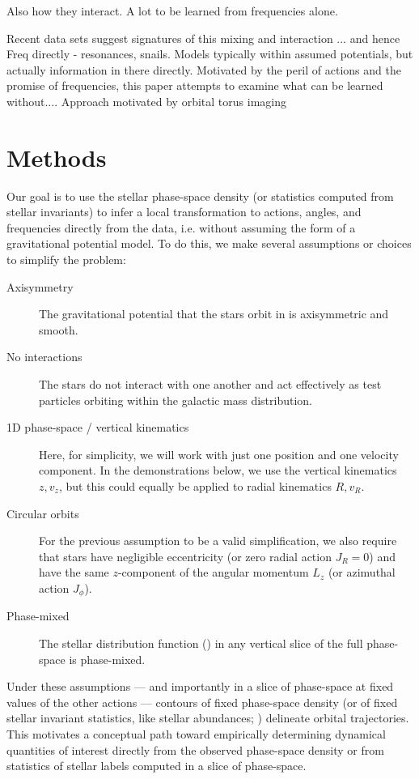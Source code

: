 Also how they interact. A lot to be learned from frequencies alone.

Recent data sets suggest signatures of this mixing and interaction ... and hence Freq
directly - resonances, snails. Models typically within assumed potentials, but actually
information in there directly. Motivated by the peril of actions and the promise of
frequencies, this paper attempts to examine what can be learned without.... Approach
motivated by orbital torus imaging


\section{Methods} \label{sec:methods}

Our goal is to use the stellar phase-space density (or statistics computed from stellar
invariants) to infer a local transformation to actions, angles, and frequencies directly
from the data, i.e. without assuming the form of a gravitational potential model.
To do this, we make several assumptions or choices to simplify the problem:
\begin{description}
    \item[Axisymmetry] The gravitational potential that the stars orbit in is
    axisymmetric and smooth.
    \item[No interactions] The stars do not interact with one another and act
    effectively as test particles orbiting within the galactic mass distribution.
    \item[1D phase-space / vertical kinematics] Here, for simplicity, we will work with
    just one position and one velocity component. In the demonstrations below, we use
    the vertical kinematics $z, v_z$, but this could equally be applied to radial
    kinematics $R, v_R$.
    \item[Circular orbits] For the previous assumption to be a valid simplification, we
    also require that stars have negligible eccentricity (or zero radial action $J_R=0$)
    and have the same $z$-component of the angular momentum $L_z$ (or azimuthal action
    $J_\phi$).
    \item[Phase-mixed] The stellar distribution function (\df) in any vertical slice of
    the full phase-space is phase-mixed.
\end{description}
Under these assumptions --- and importantly in a slice of phase-space at fixed values of
the other actions --- contours of fixed phase-space density (or of fixed stellar
invariant statistics, like stellar abundances; \citealt{Price-Whelan:2021}) delineate
orbital trajectories.
This motivates a conceptual path toward empirically determining dynamical quantities of
interest directly from the observed phase-space density or from statistics of stellar
labels computed in a slice of phase-space.

